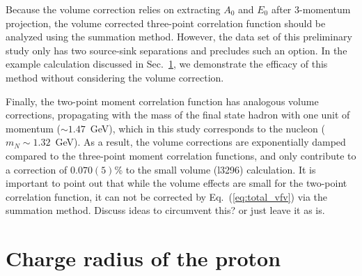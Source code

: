 \documentclass[prd,aps,twocolumn,superscriptaddress,tightenlines,nofootinbib,floatfix,preprintnumbers,10pt]{revtex4-1}
\begin{document}
Because the volume correction relies on extracting $A_0$ and $E_0$ after 3-momentum projection, the volume corrected three-point correlation function should be analyzed using the summation method. However, the data set of this preliminary study only has two source-sink separations and precludes such an option. In the example calculation discussed in Sec.~\ref{sec:results}, we demonstrate the efficacy of this method without considering the volume correction.

Finally, the two-point moment correlation function has analogous volume corrections, propagating with the mass of the final state hadron with one unit of momentum ($\sim 1.47$~GeV), which in this study corresponds to the nucleon ($m_N \sim 1.32$~GeV). As a result, the volume corrections are exponentially damped compared to the three-point moment correlation functions, and only contribute to a correction of $0.070(5)$\% to the small volume (l3296) calculation. It is important to point out that while the volume effects are small for the two-point correlation function, it can not be corrected by Eq.~(\ref{eq:total_vfv}) via the summation method. {\color{red} Discuss ideas to circumvent this? or just leave it as is.}


\section{Charge radius of the proton}\label{sec:results}
\end{document}

